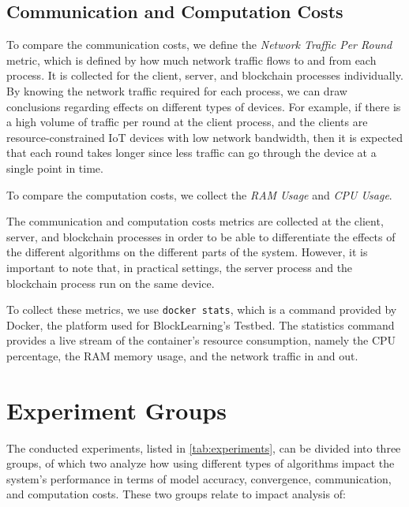 \subsection{Communication and Computation Costs}

To compare the communication costs, we define the \textit{Network Traffic Per Round} metric, which is defined by how much network traffic flows to and from each process. It is collected for the client, server, and blockchain processes individually. By knowing the network traffic required for each process, we can draw conclusions regarding effects on different types of devices. For example, if there is a high volume of traffic per round at the client process, and the clients are resource-constrained IoT devices with low network bandwidth, then it is expected that each round takes longer since less traffic can go through the device at a single point in time.

To compare the computation costs, we collect the \textit{RAM Usage} and \textit{CPU Usage}. 

The communication and computation costs metrics are collected at the client, server, and blockchain processes in order to be able to differentiate the effects of the different algorithms on the different parts of the system. However, it is important to note that, in practical settings, the server process and the blockchain process run on the same device.

To collect these metrics, we use \texttt{docker stats}, which is a command provided by Docker, the platform used for BlockLearning's Testbed. The statistics command provides a live stream of the container's resource consumption, namely the CPU percentage, the RAM memory usage, and the network traffic in and out.

\section{Experiment Groups}\label{meth:experiments}

The conducted experiments, listed in \autoref{tab:experiments}, can be divided into three groups, of which two analyze how using different types of algorithms impact the system's performance in terms of model accuracy, convergence, communication, and computation costs. These two groups relate to impact analysis of:

